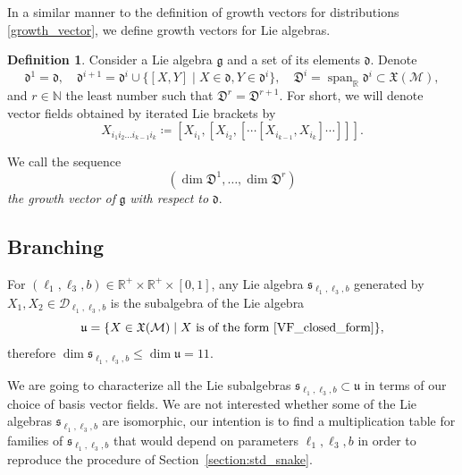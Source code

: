 \documentclass{amsart}
\theoremstyle{plain}
\theoremstyle{definition}
\newtheorem*{definition}{Definition}
\theoremstyle{remark}
\newcommand{\N}{\mathbb{N}}
\newcommand{\R}{\mathbb{R}}
\newcommand{\mc}[1]{\mathcal{#1}}
\newcommand{\mfk}[1]{\mathfrak{#1}}
\newcommand{\on}[1]{\operatorname{#1}}
\begin{document}
In a similar manner to the definition of growth vectors for distributions \eqref{growth_vector}, we define growth vectors for Lie algebras.
\begin{definition}
    Consider a Lie algebra $\mfk{g}$ and a set of its elements $\mfk{d}$. Denote
    \begin{equation}
        \mfk{d}^1 = \mfk{d},
        \quad \mfk{d}^{i+1} = \mfk{d}^i \cup \{ [X,Y] \mid X\in \mfk{d}, Y \in \mfk{d}^i \},
        \quad \mfk{D}^{i} = \on{span}_\R \mfk{d}^i \subset \mfk{X}(\mc{M}),
    \end{equation}
    and $r \in \N$ the least number such that $\mfk{D}^r = \mfk{D}^{r+1}$. For short, we will denote vector fields %
    obtained by iterated Lie brackets by
    \begin{equation} \label{LB_shortcut}
        X_{i_1 i_2\dots i_{k-1} i_k} \coloneqq [X_{i_1}, [X_{i_2}, [\cdots [X_{i_{k-1}}, X_{i_k}]\cdots]]].
    \end{equation}
    
    We call the sequence
    \begin{equation} \label{growth_vector_by_VF}
        (\dim \mfk{D}^1, \dots, \dim \mfk{D}^r)
    \end{equation}
    \emph{the growth vector of} $\mfk{g}$ \emph{with respect to} $\mfk{d}$.
\end{definition}

\subsection{Branching}

For $(\ell_1,\ell_3,b) \in \R^+ \times \R^+ \times [0,1]$, any Lie algebra $\mfk{s}_{\ell_1,\ell_3,b}$ generated by $X_1,X_2 \in \mc{D}_{\ell_1,\ell_3,b}$ is the subalgebra of the Lie algebra
\[ \mfk{u} = \{ X \in \mfk{X} (\mc{M}) \mid X\ \text{is of the form \eqref{VF_closed_form}}\}, \]
therefore $\dim \mfk{s}_{\ell_1,\ell_3,b} \leq \dim \mfk{u} = 11$.

We are going to characterize all the Lie subalgebras $\mfk{s}_{\ell_1,\ell_3,b} \subset \mfk{u}$ in terms of our choice of basis vector fields. We are not interested whether some of the Lie algebras $\mfk{s}_{\ell_1,\ell_3,b}$ are isomorphic, our intention is to find a multiplication table for families of $\mfk{s}_{\ell_1,\ell_3,b}$ that would depend on parameters $\ell_1,\ell_3,b$ in order to reproduce the procedure of Section~\ref{section:std_snake}.
\end{document}
